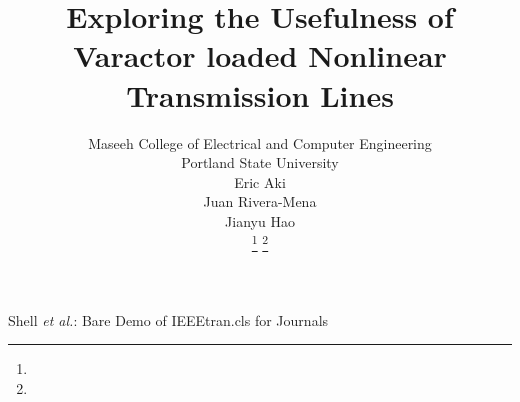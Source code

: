 \documentclass[journal]{IEEEtran} \usepackage[english]{babel}
\begin{document}
\title{Exploring the Usefulness of Varactor loaded Nonlinear Transmission Lines}

\author{Maseeh College of Electrical and Computer Engineering\\
Portland State University \\
Eric Aki\\
Juan Rivera-Mena\\
Jianyu Hao\\
\thanks{}%
\thanks{}}




%
{Shell \MakeLowercase{\textit{et al.}}: Bare Demo of IEEEtran.cls for Journals}
\end{document}
